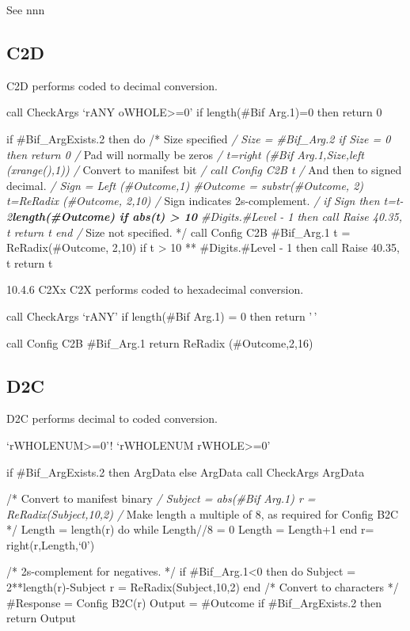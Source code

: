 See nnn

\hypertarget{c2d}{%
\subsection{C2D}\label{c2d}}

C2D performs coded to decimal conversion.

call CheckArgs `rANY oWHOLE\textgreater=0' if length(\#Bif Arg.1)=0 then
return 0

if \#Bif\_ArgExists.2 then do /* Size specified \emph{/ Size =
\#Bif\_Arg.2 if Size = 0 then return 0 /} Pad will normally be zeros
\emph{/ t=right (\#Bif Arg.1,Size,left (xrange(),1)) /} Convert to
manifest bit \emph{/ call Config C2B t /} And then to signed decimal.
\emph{/ Sign = Left (\#Outcome,1) \#Outcome = substr(\#Outcome, 2)
t=ReRadix (\#Outcome, 2,10) /} Sign indicates 2s-complement. \emph{/ if
Sign then t=t-2\textbf{length(\#Outcome) if abs(t) \textgreater{} 10 }
\#Digits.\#Level - 1 then call Raise 40.35, t return t end /} Size not
specified. */ call Config C2B \#Bif\_Arg.1 t = ReRadix(\#Outcome, 2,10)
if t \textgreater{} 10 ** \#Digits.\#Level - 1 then call Raise 40.35, t
return t

10.4.6 C2Xx C2X performs coded to hexadecimal conversion.

call CheckArgs `rANY' if length(\#Bif Arg.1) = 0 then return '\,'

call Config C2B \#Bif\_Arg.1 return ReRadix (\#Outcome,2,16)

\hypertarget{d2c}{%
\subsection{D2C}\label{d2c}}

D2C performs decimal to coded conversion.

`rWHOLENUM\textgreater=0'! `rWHOLENUM rWHOLE\textgreater=0'

if \#Bif\_ArgExists.2 then ArgData else ArgData call CheckArgs ArgData

/* Convert to manifest binary \emph{/ Subject = abs(\#Bif Arg.1) r =
ReRadix(Subject,10,2) /} Make length a multiple of 8, as required for
Config B2C */ Length = length(r) do while Length//8 = 0 Length =
Length+1 end r= right(r,Length,`0')

/* 2s-complement for negatives. */ if \#Bif\_Arg.1\textless0 then do
Subject = 2**length(r)-Subject r = ReRadix(Subject,10,2) end /* Convert
to characters */ \#Response = Config B2C(r) Output = \#Outcome if
\#Bif\_ArgExists.2 then return Output

